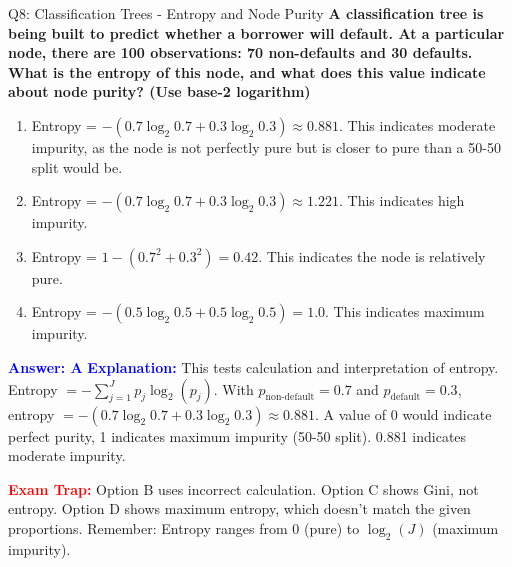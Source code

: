 \documentclass[8pt]{beamer}
\begin{document}
	\begin{frame}{Q8: Classification Trees - Entropy and Node Purity}
		\fontsize{6.5}{7.5}\selectfont
		\textbf{A classification tree is being built to predict whether a borrower will default. At a particular node, there are 100 observations: 70 non-defaults and 30 defaults. What is the entropy of this node, and what does this value indicate about node purity? (Use base-2 logarithm)}
		
		\begin{enumerate}
			\item Entropy = $-(0.7 \log_2 0.7 + 0.3 \log_2 0.3) \approx 0.881$. This indicates moderate impurity, as the node is not perfectly pure but is closer to pure than a 50-50 split would be.
			\item Entropy = $-(0.7 \log_2 0.7 + 0.3 \log_2 0.3) \approx 1.221$. This indicates high impurity.
			\item Entropy = $1 - (0.7^2 + 0.3^2) = 0.42$. This indicates the node is relatively pure.
			\item Entropy = $-(0.5 \log_2 0.5 + 0.5 \log_2 0.5) = 1.0$. This indicates maximum impurity.
		\end{enumerate}
		
		\vspace{0.1cm}
		\textcolor{blue}{\textbf{Answer: A}}
		\vspace{0.1cm}
		\textcolor{blue}{\textbf{Explanation:}} This tests calculation and interpretation of entropy. Entropy $= -\sum_{j=1}^J p_j \log_2(p_j)$. With $p_{\text{non-default}} = 0.7$ and $p_{\text{default}} = 0.3$, entropy $= -(0.7\log_2 0.7 + 0.3\log_2 0.3) \approx 0.881$. A value of 0 would indicate perfect purity, 1 indicates maximum impurity (50-50 split). 0.881 indicates moderate impurity.
		
		\textcolor{red}{\textbf{Exam Trap:}} Option B uses incorrect calculation. Option C shows Gini, not entropy. Option D shows maximum entropy, which doesn't match the given proportions. Remember: Entropy ranges from 0 (pure) to $\log_2(J)$ (maximum impurity).
	\end{frame}
	
\end{document}
